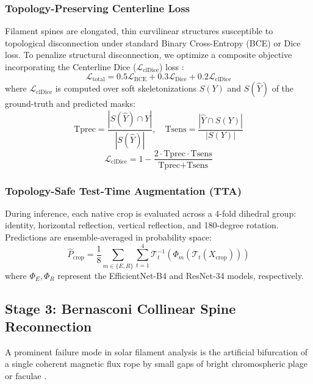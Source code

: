 \documentclass[conference]{IEEEtran}
\begin{document}
\subsubsection{Topology-Preserving Centerline Loss}
Filament spines are elongated, thin curvilinear structures susceptible to topological disconnection under standard Binary Cross-Entropy (BCE) or Dice loss. To penalize structural disconnection, we optimize a composite objective incorporating the Centerline Dice ($\mathcal{L}_{\text{clDice}}$) loss \cite{shit2021cldice}:
\begin{equation}
\mathcal{L}_{\text{total}} = 0.5 \mathcal{L}_{\text{BCE}} + 0.3 \mathcal{L}_{\text{Dice}} + 0.2 \mathcal{L}_{\text{clDice}}
\end{equation}
where $\mathcal{L}_{\text{clDice}}$ is computed over soft skeletonizations $S(Y)$ and $S(\hat{Y})$ of the ground-truth and predicted masks:
\begin{equation}
\text{Tprec} = \frac{|S(\hat{Y}) \cap Y|}{|S(\hat{Y})|}, \quad \text{Tsens} = \frac{|\hat{Y} \cap S(Y)|}{|S(Y)|}
\end{equation}
\begin{equation}
\mathcal{L}_{\text{clDice}} = 1 - \frac{2 \cdot \text{Tprec} \cdot \text{Tsens}}{\text{Tprec} + \text{Tsens}}
\end{equation}

\subsubsection{Topology-Safe Test-Time Augmentation (TTA)}
During inference, each native crop is evaluated across a 4-fold dihedral group: identity, horizontal reflection, vertical reflection, and 180-degree rotation. Predictions are ensemble-averaged in probability space:
\begin{equation}
\hat{P}_{\text{crop}} = \frac{1}{8} \sum_{m \in \{E, R\}} \sum_{t=1}^4 \mathcal{T}_t^{-1} \left( \Phi_m(\mathcal{T}_t(X_{\text{crop}})) \right)
\end{equation}
where $\Phi_E, \Phi_R$ represent the EfficientNet-B4 and ResNet-34 models, respectively.

\subsection{Stage 3: Bernasconi Collinear Spine Reconnection}
A prominent failure mode in solar filament analysis is the artificial bifurcation of a single coherent magnetic flux rope by small gaps of bright chromospheric plage or faculae \cite{bernasconi2005}. 
\end{document}
